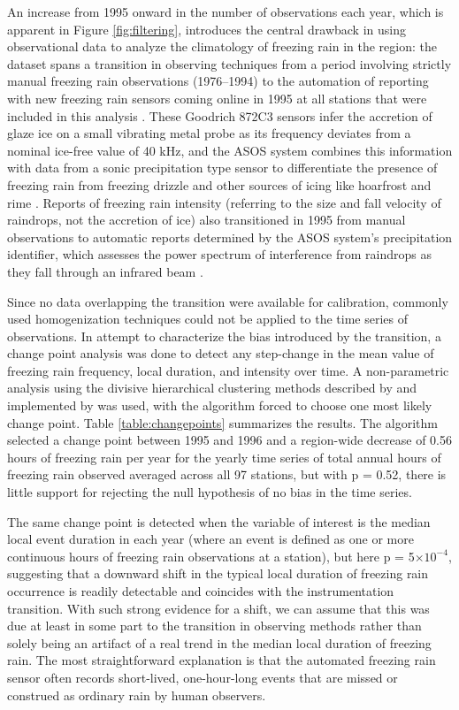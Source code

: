 \documentclass[twocol]{ametsoc}
\begin{document}
An increase from 1995 onward in the number of observations each year, which is apparent in Figure \ref{fig:filtering}, introduces the central drawback in using observational data to analyze the climatology of freezing rain in the region: the dataset spans a transition in observing techniques from a period involving strictly manual freezing rain observations (1976--1994) to the automation of reporting with new freezing rain sensors coming online in 1995 at all stations that were included in this analysis \citep{ramsay1995status}. These Goodrich 872C3 sensors infer the accretion of glaze ice on a small vibrating metal probe as its frequency deviates from a nominal ice-free value of 40 kHz, and the ASOS system combines this information with data from a sonic precipitation type sensor to differentiate the presence of freezing rain from freezing drizzle and other sources of icing like hoarfrost and rime \citep{asos1998}. Reports of freezing rain intensity (referring to the size and fall velocity of raindrops, not the accretion of ice) also transitioned in 1995 from manual observations to automatic reports determined by the ASOS system's precipitation identifier, which assesses the power spectrum of interference from raindrops as they fall through an infrared beam \citep{asos1998}.

Since no data overlapping the transition were available for calibration, commonly used homogenization techniques could not be applied to the time series of observations. In attempt to characterize the bias introduced by the transition, a change point analysis was done to detect any step-change in the mean value of freezing rain frequency, local duration, and intensity over time. A non-parametric analysis using the divisive hierarchical clustering methods described by \citet{matteson2014nonparametric} and implemented by \citet{james2013ecp} was used, with the algorithm forced to choose one most likely change point. Table \ref{table:changepoints} summarizes the results. The algorithm selected a change point between 1995 and 1996 and a region-wide decrease of 0.56 hours of freezing rain per year for the yearly time series of total annual hours of freezing rain observed averaged across all 97 stations, but with p = 0.52, there is little support for rejecting the null hypothesis of no bias in the time series. 

The same change point is detected when the variable of interest is the median local event duration in each year (where an event is defined as one or more continuous hours of freezing rain observations at a station), but here p = 5$\times 10^{-4}$, suggesting that a downward shift in the typical local duration of freezing rain occurrence is readily detectable and coincides with the instrumentation transition. With such strong evidence for a shift, we can assume that this was due at least in some part to the transition in observing methods rather than solely being an artifact of a real trend in the median local duration of freezing rain. The most straightforward explanation is that the automated freezing rain sensor often records short-lived, one-hour-long events that are missed or construed as ordinary rain by human observers. 
\end{document}

